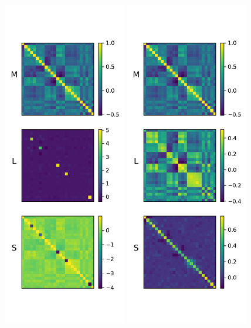 \begin{figure}
	\centering
	\includegraphics[width=0.48\textwidth]{fig/denise_output_psych.pdf}
	\includegraphics[width=0.48\textwidth]{fig/pcp_output_psych.pdf}

\end{figure}

